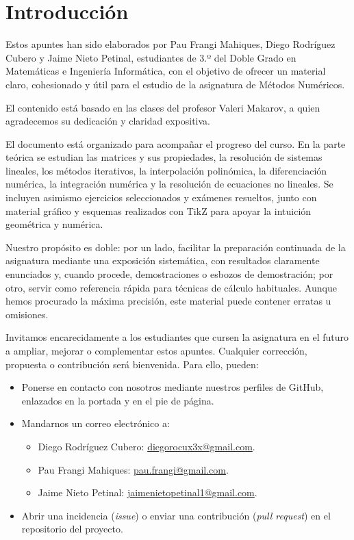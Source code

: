 \section*{Introducción}

Estos apuntes han sido elaborados por Pau Frangi Mahiques, Diego Rodríguez Cubero y Jaime Nieto Petinal, estudiantes de 3.º del Doble Grado en Matemáticas e Ingeniería Informática, con el objetivo de ofrecer un material claro, cohesionado y útil para el estudio de la asignatura de Métodos Numéricos.

El contenido está basado en las clases del profesor Valeri Makarov, a quien agradecemos su dedicación y claridad expositiva.

El documento está organizado para acompañar el progreso del curso. En la parte teórica se estudian las matrices y sus propiedades, la resolución de sistemas lineales, los métodos iterativos, la interpolación polinómica, la diferenciación numérica, la integración numérica y la resolución de ecuaciones no lineales. Se incluyen asimismo ejercicios seleccionados y exámenes resueltos, junto con material gráfico y esquemas realizados con TikZ para apoyar la intuición geométrica y numérica.

Nuestro propósito es doble: por un lado, facilitar la preparación continuada de la asignatura mediante una exposición sistemática, con resultados claramente enunciados y, cuando procede, demostraciones o esbozos de demostración; por otro, servir como referencia rápida para técnicas de cálculo habituales. Aunque hemos procurado la máxima precisión, este material puede contener erratas u omisiones.

Invitamos encarecidamente a los estudiantes que cursen la asignatura en el futuro a ampliar, mejorar o complementar estos apuntes. Cualquier corrección, propuesta o contribución será bienvenida. Para ello, pueden:
\begin{itemize}
	\item Ponerse en contacto con nosotros mediante nuestros perfiles de GitHub, enlazados en la portada y en el pie de página.
    \item Mandarnos un correo electrónico a:
	\begin{itemize}
        \item Diego Rodríguez Cubero: \href{mailto:diegorocux3x@gmail.com}{diegorocux3x@gmail.com}.
        \item Pau Frangi Mahiques: \href{mailto:pau.frangi@gmail.com}{pau.frangi@gmail.com}.
        \item Jaime Nieto Petinal: \href{mailto:jaimenietopetinal1@gmail.com}{jaimenietopetinal1@gmail.com}.
    \end{itemize}
    \item Abrir una incidencia (\emph{issue}) o enviar una contribución (\emph{pull request}) en el repositorio del proyecto.
\end{itemize}

